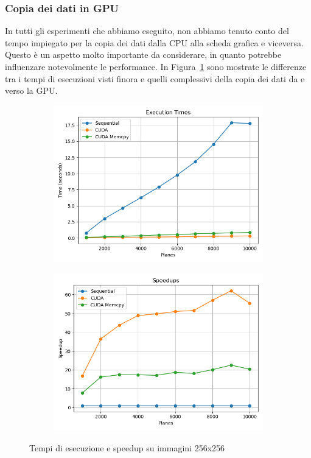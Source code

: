 \subsubsection{Copia dei dati in GPU}
In tutti gli esperimenti che abbiamo eseguito, non abbiamo tenuto conto del tempo impiegato per la copia dei dati
dalla CPU alla scheda grafica e viceversa.
Questo è un aspetto molto importante da considerare, in quanto potrebbe influenzare notevolmente le performance.
In Figura~\ref{fig:cuda_memcpy} sono mostrate le differenze tra i tempi di esecuzioni visti finora e quelli complessivi
della copia dei dati da e verso la GPU.
\begin{figure}[H]
    \centering
    \begin{subfigure}{0.49\textwidth}
        \centering
        \includegraphics[width=\textwidth]{../results/plots/256/cuda_memcpy_times}
    \end{subfigure}
    \begin{subfigure}{0.49\textwidth}
        \centering
        \includegraphics[width=\textwidth]{../results/plots/256/cuda_memcpy_speedup}
    \end{subfigure}
    \caption{Tempi di esecuzione e speedup su immagini 256x256}
    \label{fig:cuda_memcpy}
\end{figure}
